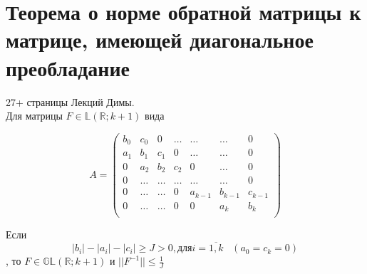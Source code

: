 \documentclass[__main__.tex]{subfiles}
\begin{document}
\section{Теорема о норме обратной матрицы к матрице, имеющей диагональное преобладание}

27+ страницы Лекций Димы.\\

Для матрицы $F \in \mathbb{L}(\mathbb{R};k+1)$ вида

\begin{equation}
\label{eq_11_2}
A = \begin{pmatrix}
b_0 & c_0 & 0 & \hdots & \hdots & \hdots & 0 \\
a_1 & b_1 & c_1 & 0 & \hdots & \hdots & 0 \\
0 & a_2 & b_2 & c_2 & 0 & \hdots & 0 \\
0 & \hdots & \hdots & \hdots & \hdots & \hdots & 0 \\
0 & \hdots & \hdots & 0 & a_{k-1} & b_{k-1} & c_{k - 1}\\
0 & \hdots & \hdots & 0 & 0 & a_k & b_k\\ 
\end{pmatrix}
\end{equation}

Если
\begin{equation}
|b_i| - |a_i| - |c_i|\ge J > 0, \text{для} i = \overline{1, k} \;\;\; (a_0 = c_k = 0)
\end{equation}
, то $F \in \mathbb{GL}(\mathbb{R};k+1)$ и $||F^{-1}||\le \frac{1}{J}$\\
\end{document}
